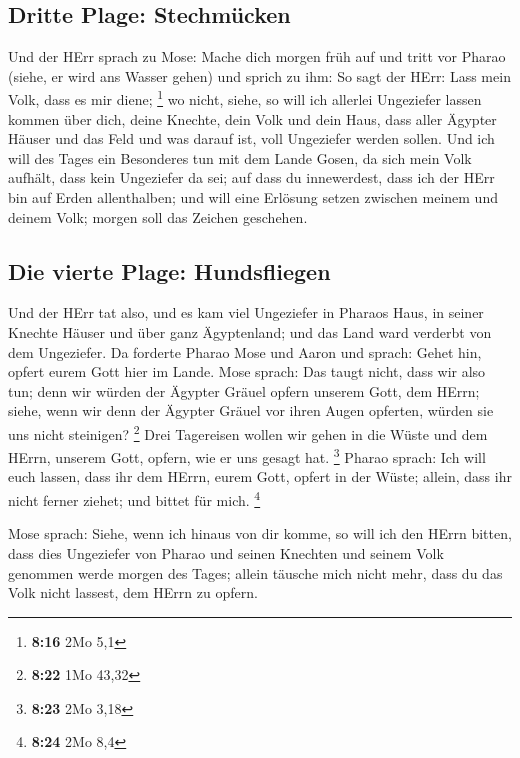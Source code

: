 \hypertarget{dritte-plage-stechmuxfccken}{%
\subsection{Dritte Plage:
Stechmücken}\label{dritte-plage-stechmuxfccken}}

 Und der HErr sprach zu Mose: Mache dich morgen früh auf
und tritt vor Pharao (siehe, er wird ans Wasser gehen) und sprich zu
ihm: So sagt der HErr: Lass mein Volk, dass es mir diene; \footnote{\textbf{8:16}
  2Mo 5,1}  wo nicht, siehe, so will ich allerlei
Ungeziefer lassen kommen über dich, deine Knechte, dein Volk und dein
Haus, dass aller Ägypter Häuser und das Feld und was darauf ist, voll
Ungeziefer werden sollen.  Und ich will des Tages ein
Besonderes tun mit dem Lande Gosen, da sich mein Volk aufhält, dass kein
Ungeziefer da sei; auf dass du innewerdest, dass ich der HErr bin auf
Erden allenthalben;  und will eine Erlösung setzen
zwischen meinem und deinem Volk; morgen soll das Zeichen geschehen.

\hypertarget{die-vierte-plage-hundsfliegen}{%
\subsection{Die vierte Plage:
Hundsfliegen}\label{die-vierte-plage-hundsfliegen}}

 Und der HErr tat also, und es kam viel Ungeziefer in
Pharaos Haus, in seiner Knechte Häuser und über ganz Ägyptenland; und
das Land ward verderbt von dem Ungeziefer.  Da forderte
Pharao Mose und Aaron und sprach: Gehet hin, opfert eurem Gott hier im
Lande.  Mose sprach: Das taugt nicht, dass wir also tun;
denn wir würden der Ägypter Gräuel opfern unserem Gott, dem HErrn;
siehe, wenn wir denn der Ägypter Gräuel vor ihren Augen opferten, würden
sie uns nicht steinigen? \footnote{\textbf{8:22} 1Mo 43,32}
 Drei Tagereisen wollen wir gehen in die Wüste und dem
HErrn, unserem Gott, opfern, wie er uns gesagt hat. \footnote{\textbf{8:23}
  2Mo 3,18}  Pharao sprach: Ich will euch lassen, dass
ihr dem HErrn, eurem Gott, opfert in der Wüste; allein, dass ihr nicht
ferner ziehet; und bittet für mich. \footnote{\textbf{8:24} 2Mo 8,4}

 Mose sprach: Siehe, wenn ich hinaus von dir komme, so
will ich den HErrn bitten, dass dies Ungeziefer von Pharao und seinen
Knechten und seinem Volk genommen werde morgen des Tages; allein täusche
mich nicht mehr, dass du das Volk nicht lassest, dem HErrn zu opfern.

